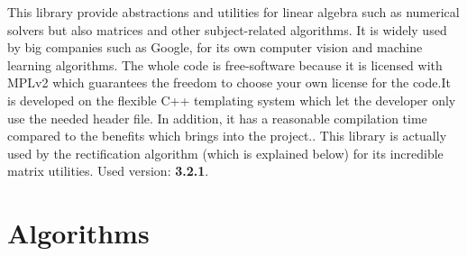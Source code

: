 This library provide abstractions and utilities for linear algebra such as numerical solvers but also matrices and other subject-related algorithms.
It is widely used by big companies such as Google, for its own computer vision and machine learning algorithms.
The whole code is free-software because it is licensed with MPLv2 which guarantees the freedom to choose your own license for the code.It is developed on the flexible C++ templating system which let the developer only use the needed header file. In addition, it has a reasonable compilation time compared to the benefits which brings into the project.\cite{eigeninfo}.
This library is actually used by the rectification algorithm (which is explained below) for its incredible matrix utilities.
\newline Used version: \textbf{3.2.1}.

\section{Algorithms}

